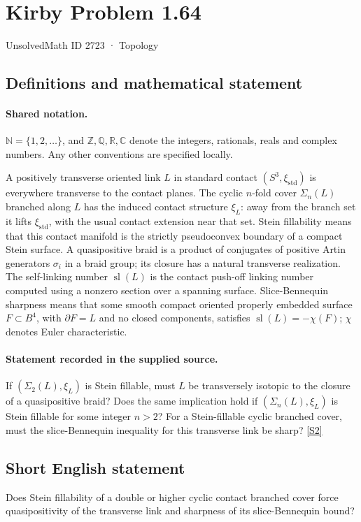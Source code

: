 \documentclass[11pt]{article}
\newcommand{\sref}[2]{\hyperlink{source:#1:#2}{[S#2]}}
\begin{document}
\setcounter{section}{2722}
\section{Kirby Problem 1.64}\label{2723}
{\small\sffamily UnsolvedMath ID 2723 · Topology}
\subsection{Definitions and mathematical statement}

\paragraph{Shared notation.}$\mathbb N=\{1,2,\ldots\}$, and $\mathbb Z,\mathbb Q,\mathbb R,\mathbb C$ denote the integers, rationals, reals and complex numbers. Any other conventions are specified locally.


A positively transverse oriented link $L$ in standard contact $(S^3,\xi_{\mathrm{std}})$ is everywhere transverse to the contact planes. The cyclic $n$-fold cover $\Sigma_n(L)$ branched along $L$ has the induced contact structure $\xi_L$: away from the branch set it lifts $\xi_{\mathrm{std}}$, with the usual contact extension near that set. Stein fillability means that this contact manifold is the strictly pseudoconvex boundary of a compact Stein surface. A quasipositive braid is a product of conjugates of positive Artin generators $\sigma_i$ in a braid group; its closure has a natural transverse realization. The self-linking number $\operatorname{sl}(L)$ is the contact push-off linking number computed using a nonzero section over a spanning surface. Slice-Bennequin sharpness means that some smooth compact oriented properly embedded surface $F\subset B^4$, with $\partial F=L$ and no closed components, satisfies $\operatorname{sl}(L)=-\chi(F)$; $\chi$ denotes Euler characteristic.
\paragraph{Statement recorded in the supplied source.}
If $(\Sigma_2(L),\xi_L)$ is Stein fillable, must $L$ be transversely isotopic to the closure of a quasipositive braid? Does the same implication hold if $(\Sigma_n(L),\xi_L)$ is Stein fillable for some integer $n>2$? For a Stein-fillable cyclic branched cover, must the slice-Bennequin inequality for this transverse link be sharp? \sref{2723}{2}

\subsection{Short English statement}
Does Stein fillability of a double or higher cyclic contact branched cover force quasipositivity of the transverse link and sharpness of its slice-Bennequin bound?
\end{document}
